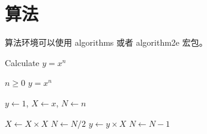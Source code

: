 \section{算法}

算法环境可以使用 algorithms 或者 algorithm2e 宏包。
\renewcommand{\algorithmicrequire}{\textbf{输入：}\unskip}
\renewcommand{\algorithmicensure}{\textbf{输出：}\unskip}

\begin{algorithm}[ht]
	\caption{Calculate $y = x^n$}
	\label{alg1}
	\small
	\begin{algorithmic}
		\REQUIRE $n \geq 0$
		\ENSURE $y = x^n$

		\STATE $y \leftarrow 1$, $X \leftarrow x$, $N \leftarrow n$

		\STATE $X \leftarrow X \times X$
		\STATE $N \leftarrow N / 2$
		\ELSE[$N$ is odd]
		\STATE $y \leftarrow y \times X$
		\STATE $N \leftarrow N - 1$
		\ENDIF
		\ENDWHILE
	\end{algorithmic}
\end{algorithm}

